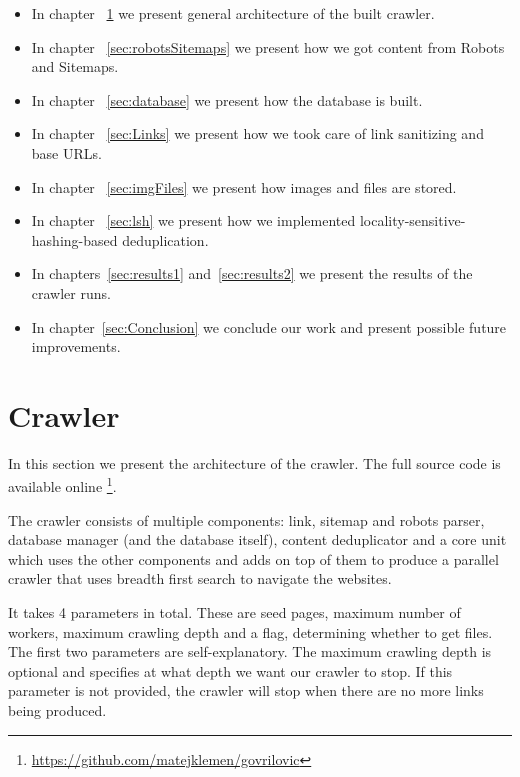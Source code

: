 \documentclass[9pt]{IEEEtran}
\begin{document}

\begin{itemize}
    \item In chapter ~\ref{sec:crawlerArchitecture} we present general architecture of the built crawler.
    \item In chapter ~\ref{sec:robotsSitemaps} we present how we got content from Robots and Sitemaps.
    \item In chapter ~\ref{sec:database} we present how the database is built.
    \item In chapter ~\ref{sec:Links} we present how we took care of link sanitizing and base URLs.
    \item In chapter ~\ref{sec:imgFiles} we present how images and files are stored.
    \item In chapter ~\ref{sec:lsh} we present how we implemented locality-sensitive-hashing-based deduplication.
    \item In chapters~\ref{sec:results1} and~\ref{sec:results2} we present the results of the crawler runs.
    \item In chapter~\ref{sec:Conclusion} we conclude our work and present possible future improvements.

\end{itemize}


\section{Crawler}\label{sec:crawlerArchitecture}
In this section we present the architecture of the crawler. 
The full source code is available online \footnote{\url{https://github.com/matejklemen/govrilovic}}.

The crawler consists of multiple components: link, sitemap and robots parser, database manager (and the database itself), content deduplicator and a core unit which uses the other components and adds on top of them to produce a parallel crawler that uses breadth first search to navigate the websites.

It takes 4 parameters in total. These are seed pages, maximum number of workers, maximum crawling depth and a flag, determining whether to get files. 
The first two parameters are self-explanatory.
The maximum crawling depth is optional and specifies at what depth we want our crawler to stop. 
If this parameter is not provided, the crawler will stop when there are no more links being produced.
\end{document}
